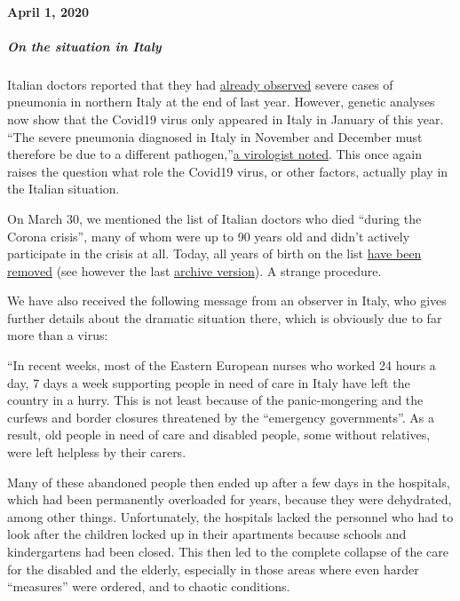 \hypertarget{april-1-2020}{%
\paragraph{April 1, 2020}\label{april-1-2020}}

\hypertarget{on-the-situation-in-italy}{%
\subparagraph{\texorpdfstring{\textbf{On the situation in
Italy}}{On the situation in Italy}}\label{on-the-situation-in-italy}}

Italian doctors reported that they had
\href{https://www.scmp.com/news/china/society/article/3076334/coronavirus-strange-pneumonia-seen-lombardy-november-leading}{already
observed} severe cases of pneumonia in northern Italy at the end of last
year. However, genetic analyses now show that the Covid19 virus only
appeared in Italy in January of this year. ``The severe pneumonia
diagnosed in Italy in November and December must therefore be due to a
different
pathogen,''\href{https://www.nzz.ch/wissenschaft/coronavirus-der-stammbaum-verraet-woher-es-kommt-ld.1548271}{a
virologist noted}. This once again raises the question what role the
Covid19 virus, or other factors, actually play in the Italian situation.

On March 30, we mentioned the list of Italian doctors who died ``during
the Corona crisis'', many of whom were up to 90 years old and didn't
actively participate in the crisis at all. Today, all years of birth on
the list
\href{https://portale.fnomceo.it/elenco-dei-medici-caduti-nel-corso-dellepidemia-di-covid-19/}{have
been removed} (see however the last
\href{https://web.archive.org/web/20200328152430/https://portale.fnomceo.it/elenco-dei-medici-caduti-nel-corso-dellepidemia-di-covid-19/}{archive
version}). A strange procedure.

We have also received the following message from an observer in Italy,
who gives further details about the dramatic situation there, which is
obviously due to far more than a virus:

``In recent weeks, most of the Eastern European nurses who worked 24
hours a day, 7 days a week supporting people in need of care in Italy
have left the country in a hurry. This is not least because of the
panic-mongering and the curfews and border closures threatened by the
``emergency governments''. As a result, old people in need of care and
disabled people, some without relatives, were left helpless by their
carers.

Many of these abandoned people then ended up after a few days in the
hospitals, which had been permanently overloaded for years, because they
were dehydrated, among other things. Unfortunately, the hospitals lacked
the personnel who had to look after the children locked up in their
apartments because schools and kindergartens had been closed. This then
led to the complete collapse of the care for the disabled and the
elderly, especially in those areas where even harder ``measures'' were
ordered, and to chaotic conditions.

